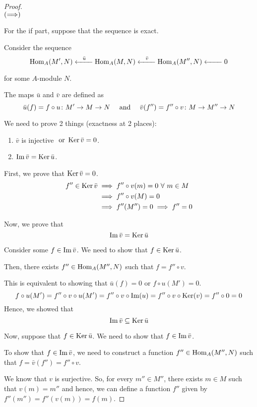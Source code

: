 \begin{proof} \ \\
	\(\left( \Longrightarrow \right)\)

	For the if part, suppose that the sequence is exact.

	Consider the sequence
	\[
		\operatorname{Hom}_A(M', N) \xleftarrow[\quad\quad]{\bar{u}} \operatorname{Hom}_A(M, N)
		\xleftarrow[\quad\quad]{\bar{v}} \operatorname{Hom}_A(M'', N)
		\xleftarrow[\quad\quad]{} 0
	\]
	for some \(A\)-module \(N\).

	The maps \(\bar{u}\) and \(\bar{v}\) are defined as
	\[
		\bar{u}(f) = f \circ u \colon M' \to M \to N
		\quad \text{ and } \quad \bar{v}(f'') = f'' \circ v \colon M \to M'' \to N
	\]

	We need to prove 2 things (exactness at 2 places):
	\begin{enumerate}
		\item \(\bar{v}\) is injective \(\text{ or } \operatorname{Ker}\bar{v} = 0\).
		\item \(\operatorname{Im}\bar{v} = \operatorname{Ker}\bar{u}\).
	\end{enumerate}

	First, we prove that \(\operatorname{Ker}\bar{v} = 0\).
	\begin{align*}
		f'' \in \Ker\bar{v} &\implies f'' \circ v (m) = 0 \ \forall\ m \in M \\
		&\implies f'' \circ v(M) = 0 \\
		&\implies f''(M'') = 0 \implies f'' = 0
	\end{align*}

	Now, we prove that
	\[
		\operatorname{Im}\bar{v} = \operatorname{Ker}\bar{u}
	\]

	Consider some \(f \in \operatorname{Im}\bar{v}\).
	We need to show that \(f \in \operatorname{Ker}\bar{u}\).

	Then, there exists \(f'' \in \operatorname{Hom}_A(M'', N)\) such that
	\(f = f'' \circ v\).


	This is equivalent to showing that \(\bar{u}(f) = 0\)
	or \(f \circ u (M') = 0\).
	\[
		f \circ u (M') = f'' \circ v \circ u (M')
		= f'' \circ v \circ \operatorname{Im}(u) = f'' \circ v \circ \operatorname{Ker}(v)
		= f'' \circ 0 = 0
	\]
	Hence, we showed that
	\[
		\operatorname{Im}\bar{v} \subseteq \operatorname{Ker}\bar{u}
	\]

	Now, suppose that \(f \in \operatorname{Ker}\bar{u}\).
	We need to show that \(f \in \operatorname{Im}\bar{v}\).

	To show that \(f \in \operatorname{Im}\bar{v}\), we need to construct a
	function \(f'' \in \operatorname{Hom}_A(M'', N)\) such that
	\(f = \bar{v}(f'') = f'' \circ v\).

	We know that \(v\) is surjective.
	So, for every \(m'' \in M''\), there exists \(m \in M\) such that
	\(v(m) = m''\) and hence, we can define a function \(f''\)
	given by \(f''(m'') = f''(v(m)) = f(m)\).


\end{proof}
